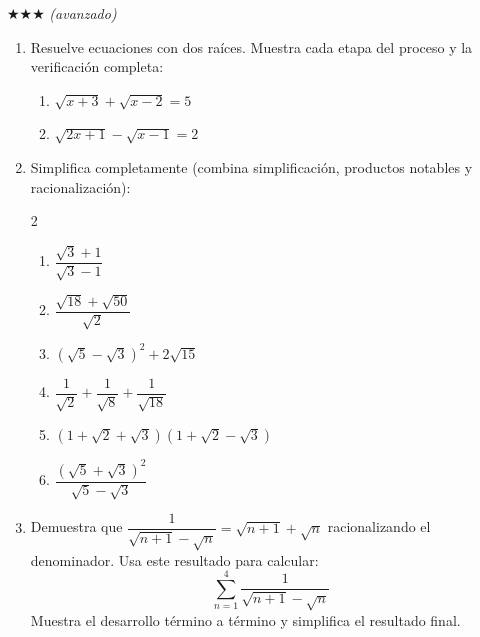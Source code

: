 \documentclass[11pt, letterpaper]{article}
\begin{document}
$\bigstar\bigstar\bigstar$ \textit{(avanzado)}

\begin{enumerate}[label=\textbf{\arabic*.}, leftmargin=*, resume]
  \item Resuelve ecuaciones con dos raíces. Muestra cada etapa del proceso y la verificación completa:
  \begin{enumerate}[label=\alph*)]
    \item $\sqrt{x+3}+\sqrt{x-2} = 5$
    \item $\sqrt{2x+1}-\sqrt{x-1} = 2$
  \end{enumerate}

  \item Simplifica completamente (combina simplificación, productos notables y racionalización):
  \begin{multicols}{2}
  \begin{enumerate}[label=\alph*)]
    \item $\dfrac{\sqrt{3}+1}{\sqrt{3}-1}$
    \item $\dfrac{\sqrt{18}+\sqrt{50}}{\sqrt{2}}$
    \item $(\sqrt{5}-\sqrt{3})^2+2\sqrt{15}$
    \item $\dfrac{1}{\sqrt{2}}+\dfrac{1}{\sqrt{8}}+\dfrac{1}{\sqrt{18}}$
    \item $(1+\sqrt{2}+\sqrt{3})(1+\sqrt{2}-\sqrt{3})$
    \item $\dfrac{(\sqrt{5}+\sqrt{3})^2}{\sqrt{5}-\sqrt{3}}$
  \end{enumerate}
  \end{multicols}

  \item Demuestra que $\dfrac{1}{\sqrt{n+1}-\sqrt{n}} = \sqrt{n+1}+\sqrt{n}$ racionalizando el denominador. Usa este resultado para calcular:
  $$\sum_{n=1}^{4}\frac{1}{\sqrt{n+1}-\sqrt{n}}$$
  Muestra el desarrollo término a término y simplifica el resultado final.
\end{enumerate}
\end{document}
